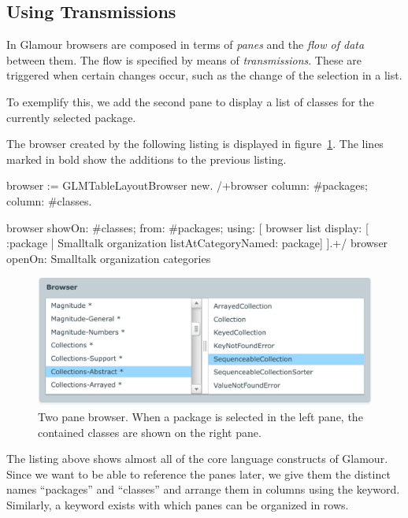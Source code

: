 \documentclass[a4paper,10pt,twoside]{book}
\begin{document}
\subsection{Using Transmissions}

In Glamour browsers are composed in terms of \emph{panes} and the
\emph{flow of data} between them. The flow is specified by means of
\emph{transmissions}. These are triggered when certain changes occur,
such as the change of the selection in a list.

To exemplify this, we add the second pane to display a list of classes
for the currently selected package.

The browser created by the following listing is displayed in
figure~\ref{fig:showclasses}. The lines marked in bold show the
additions to the previous listing.

\begin{code}{}
browser := GLMTableLayoutBrowser new.
/+browser
	column: #packages;
	column: #classes.

browser showOn: #classes; from: #packages; using: [
	browser list
		display: [ :package | Smalltalk organization listAtCategoryNamed: package]
].+/
browser openOn: Smalltalk organization categories
\end{code}

\begin{figure}[htbp]
\centerline{\includegraphics[width=\linewidth]{showclasses.pdf}}
\caption{Two pane browser. When a package is selected in the left
  pane, the contained classes are shown on the right pane.}
\label{fig:showclasses}
\end{figure}

The listing above shows almost all of the core language constructs of
Glamour. Since we want to be able to reference the panes later, we
give them the distinct names ``packages'' and ``classes'' and arrange them
in columns using the  keyword. Similarly, a 
keyword exists with which panes can be organized in rows.
\end{document}
